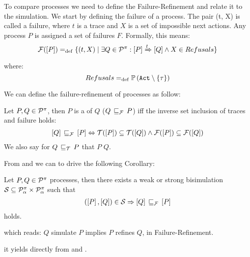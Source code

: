 To compare \picalc{} processes we need to define the Failure-Refinement and relate it to the simulation. We start by defining the failure of a process.
The pair (t, X) is called a failure, where $t$ is a trace and $X$ is a set of impossible next actions. Any process
$P$ is assigned a set of failures $F$. Formally, this means:
\begin{align}
    \failures[P] \define \{(t,X) \mid \exists Q\in\procs: \ec{P} \bigstep{t} \ec{Q}\wedge X\in Refusals\}
\label{failure}
\end{align}
where: \[Refusals \define \pom{\actions\setminus\set{\tau}}\]

We can define the failure-refinement of \picalc{} processes as follow:

\begin{definition}
\label{def_failure_ref}
	Let $P,Q\in\mathcal P^{\pi}$, then $P$ is a  of $Q$ ($Q\refiF P$) iff the inverse set inclusion of traces and failure holds:
\begin{align}
   \ec{Q} \refiF \ec{P} \Leftrightarrow  \traces[P]\subseteq\traces[Q] \wedge \failures[P]\subseteq\failures[Q]
\end{align}
	We also say for $Q\refi{}P$ that $P$  $Q$.
\end{definition}

From  and  we can to drive the following Corollary: 

\begin{cor}
\label{cor_sim_failure_refinement}
Let $P,Q\in\mathcal P^{\pi}$ processes, then there exists a weak or strong bisimulation $\mathcal{S}\subseteq\mathcal P^{\pi}_\alpha\times\mathcal P^{\pi}_\alpha$ such that
\begin{align}
    (\ec{P},\ec{Q})\in{}\simu  \Rightarrow \ec{Q} \refiF \ec{P}
   \label{failure_model}
\end{align}
holds.
\end{cor}%
which reads:  $Q$ simulate $P$ implies $P$ refines $Q$, in Failure-Refinement.

\begin{prf}
it yields directly from  and .
\end{prf}
